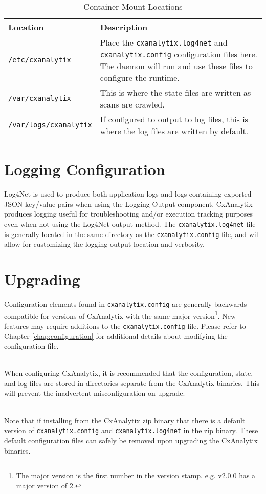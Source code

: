 \begin{table}
    \centering
    \begin{tabular}{|l|l|}
        \toprule
        \textbf{Location} & \textbf{Description}\\
        \midrule
        \verb|/etc/cxanalytix| & \makecell[l]{Place the \texttt{cxanalytix.log4net} and \texttt{cxanalytix.config} configuration files here.
        \\The daemon will run and use these files to configure the runtime.}\\
        \midrule
        \verb|/var/cxanalytix| & This is where the state files are written as scans are crawled.\\
        \midrule
        \verb|/var/logs/cxanalytix| & If configured to output to log files, this is where the log files are written by default.\\
        \bottomrule
    \end{tabular}
    \caption{Container Mount Locations}
    \label{tab:mounts}
\end{table}


\section{Logging Configuration}

Log4Net is used to produce both application logs and logs containing exported JSON key/value pairs when using the Logging Output component. 
CxAnalytix produces logging useful for troubleshooting and/or execution tracking purposes even when not using the Log4Net output method.  The 
\texttt{cxanalytix.log4net} file is generally located in the same directory as the \texttt{cxanalytix.config} file, and will allow for
customizing the logging output location and verbosity.



\section{Upgrading}


Configuration elements found in \texttt{cxanalytix.config} are generally backwards compatible for versions
of CxAnalytix with the same major version\footnote{The major version is the first 
number in the version stamp.  e.g. v2.0.0 has a major version of 2.}.  New features may require additions
to the \texttt{cxanalytix.config} file. Please refer to Chapter \ref{chap:configuration} for additional details
about modifying the configuration file.


\noindent\\When configuring CxAnalytix, it is recommended that the configuration, state, and log files are stored
in directories separate from the CxAnalytix binaries.  This will prevent the inadvertent misconfiguration on upgrade.


\noindent\\Note that if installing from the CxAnalytix zip binary that there is a default version of \texttt{cxanalytix.config}
and \texttt{cxanalytix.log4net} in the zip binary.  These default configuration files can safely be removed upon
upgrading the CxAnalytix binaries.
